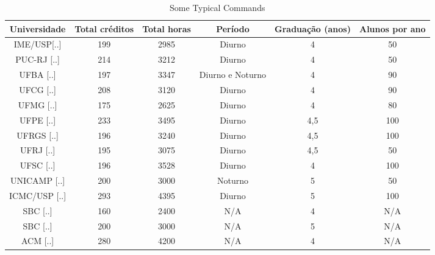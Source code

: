 \documentclass[conference]{IEEEtran}
\begin{document}
\begin{table*}
	\centering
	\caption{Some Typical Commands}
    \begin{tabular}{|c|c|c|c|c|c|}
        \hline
        Universidade  & Total créditos & Total horas & Período          & Graduação (anos) & Alunos por ano \\ \hline
        IME/USP[..]   & 199            & 2985        & Diurno           & 4               & 50                   \\ 
        PUC-RJ [..]   & 214            & 3212        & Diurno           & 4               & 50                   \\ 
        UFBA [..]     & 197            & 3347        & Diurno e Noturno & 4               & 90                   \\ 
        UFCG [..]     & 208            & 3120        & Diurno           & 4               & 90                   \\ 
        UFMG [..]     & 175            & 2625        & Diurno           & 4               & 80                   \\ 
        UFPE [..]     & 233            & 3495        & Diurno           & 4,5             & 100                  \\ 
        UFRGS [..]    & 196            & 3240        & Diurno           & 4,5             & 100                  \\ 
        UFRJ [..]     & 195            & 3075        & Diurno           & 4,5             & 50                   \\ 
        UFSC [..]     & 196            & 3528        & Diurno           & 4               & 100                  \\ 
        UNICAMP [..]  & 200            & 3000        & Noturno          & 5               & 50                   \\ 
        ICMC/USP [..] & 293            & 4395        & Diurno           & 5               & 100                  \\ 
        SBC [..]      & 160            & 2400        & N/A              & 4               & N/A                  \\ 
        SBC [..]      & 200            & 3000        & N/A              & 5               & N/A                  \\ 
        ACM [..]      & 280            & 4200        & N/A              & 4               & N/A                  \\
        \hline
    \end{tabular}
\end{table*}
\end{document}

